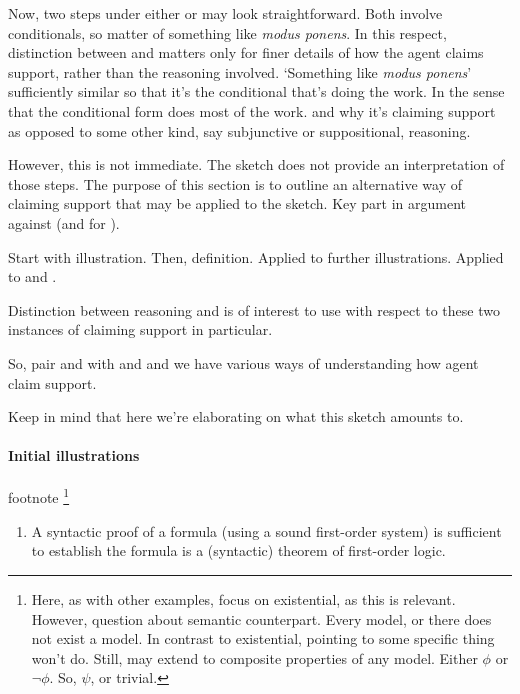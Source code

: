 \begin{note}
  Now, two steps under either \AR{} or \WR{} may look straightforward.
  Both involve conditionals, so matter of something like \emph{modus ponens}.
  In this respect, distinction between \AR{} and \WR{} matters only for finer details of how the agent claims support, rather than the reasoning involved.
  `Something like \emph{modus ponens}' sufficiently similar so that it's the conditional that's doing the work.
  In the sense that the conditional form does most of the work.
  \AR{} and \WR{} why it's claiming support as opposed to some other kind, say subjunctive or suppositional, reasoning.

  However, this is not immediate.
  The sketch does not provide an interpretation of those steps.
  The purpose of this section is to outline an alternative way of claiming support that may be applied to the sketch.
  Key part in argument against \ESU{} (and for \EAS{}).

  Start with illustration.
  Then, definition.
  Applied to further illustrations.
  Applied to \AR{} and \WR{}.


  Distinction between reasoning \adA{} and \adB{} is of interest to use with respect to these two instances of claiming support in particular.

  So, pair \AR{} and \WR{} with \adA{} and \adB{} and we have various ways of understanding how agent claim support.

  Keep in mind that here we're elaborating on what this sketch amounts to.
\end{note}

\paragraph{Initial illustrations}

\begin{note}

  {\color{red} footnote}\nolinebreak
  \footnote{
    Here, as with other examples, focus on existential, as this is relevant.
    However, question about semantic counterpart.
    Every model, or there does not exist a model.
    In contrast to existential, pointing to some specific thing won't do.
    Still, may extend to composite properties of any model.
    Either \(\phi\) or \(\lnot\phi\).
    So, \(\psi\), or trivial.
  }

  \begin{enumerate}[label=\named{\(\exists\mathord{\vdash}{,}\top\)}, ref=\named{\(\exists\mathord{\vdash}{,}\top\)}]
  \item\label{ill:Eproof:def} A syntactic proof of a formula (using a sound first-order system) is sufficient to establish the formula is a (syntactic) theorem of first-order logic.
  \end{enumerate}
\end{note}

